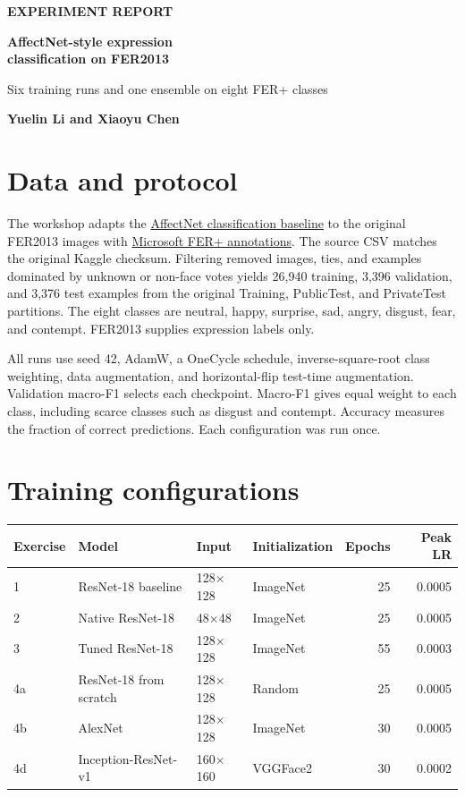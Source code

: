 \documentclass[10pt,letterpaper]{article}
\newcommand{\eyebrow}[1]{{\small\sffamily\bfseries\color{accent}#1}\par}
\newcommand{\sizepx}[1]{#1\ensuremath{\times}#1}
\begin{document}
\eyebrow{EXPERIMENT REPORT}
\vspace{3pt}
{\fontsize{27}{31}\selectfont\sffamily\bfseries\color{ink}
AffectNet-style expression\\classification on FER2013\par}
\vspace{5pt}
{\large\color{muted}Six training runs and one ensemble on eight FER+ classes\par}
\vspace{6pt}
{\normalsize\sffamily\bfseries\color{ink}Yuelin Li and Xiaoyu Chen\par}
\vspace{8pt}

\section{Data and protocol}

The workshop adapts the \href{https://arxiv.org/abs/1708.03985}{AffectNet classification baseline} to the original FER2013 images with \href{https://github.com/microsoft/FERPlus}{Microsoft FER+ annotations}. The source CSV matches the original Kaggle checksum. Filtering removed images, ties, and examples dominated by unknown or non-face votes yields 26,940 training, 3,396 validation, and 3,376 test examples from the original Training, PublicTest, and PrivateTest partitions. The eight classes are neutral, happy, surprise, sad, angry, disgust, fear, and contempt. FER2013 supplies expression labels only.

All runs use seed 42, AdamW, a OneCycle schedule, inverse-square-root class weighting, data augmentation, and horizontal-flip test-time augmentation. Validation macro-F1 selects each checkpoint. Macro-F1 gives equal weight to each class, including scarce classes such as disgust and contempt. Accuracy measures the fraction of correct predictions. Each configuration was run once.

\section{Training configurations}

{\small
\begin{tabularx}{\textwidth}{@{}lYlYrr@{}}
\toprule
Exercise & Model & Input & Initialization & Epochs & Peak LR\\
  & ResNet-18 baseline      & \sizepx{128} & ImageNet & 25 & 0.0005\\
2  & Native ResNet-18        & \sizepx{48}  & ImageNet & 25 & 0.0005\\
3  & Tuned ResNet-18         & \sizepx{128} & ImageNet & 55 & 0.0003\\
4a & ResNet-18 from scratch  & \sizepx{128} & Random   & 25 & 0.0005\\
4b & AlexNet                 & \sizepx{128} & ImageNet & 30 & 0.0005\\
4d & Inception-ResNet-v1     & \sizepx{160} & VGGFace2 & 30 & 0.0002\\
\bottomrule
\end{tabularx}\par}
\end{document}
